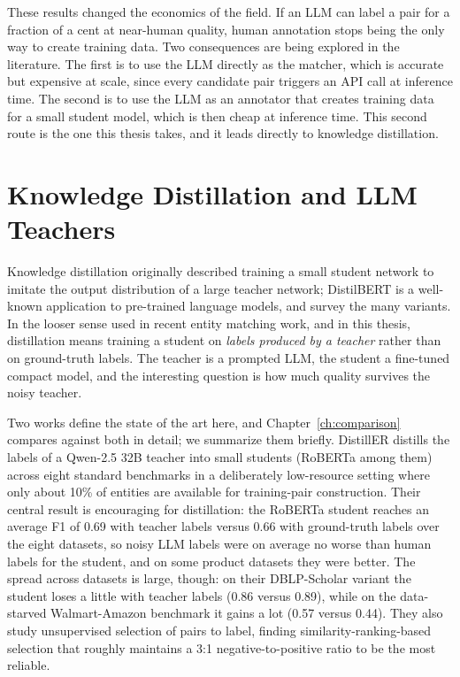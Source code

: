 \documentclass[a4paper,oneside,bibliography=totoc]{scrbook}
\begin{document}
These results changed the economics of the field. If an LLM can label a pair for a fraction of a cent at near-human quality, human annotation stops being the only way to create training data. Two consequences are being explored in the literature. The first is to use the LLM directly as the matcher, which is accurate but expensive at scale, since every candidate pair triggers an API call at inference time. The second is to use the LLM as an annotator that creates training data for a small student model, which is then cheap at inference time. This second route is the one this thesis takes, and it leads directly to knowledge distillation.

\section{Knowledge Distillation and LLM Teachers}
\label{sec:rw_distillation}

Knowledge distillation \cite{hinton2015distilling} originally described training a small student network to imitate the output distribution of a large teacher network; DistilBERT \cite{sanh2019distilbert} is a well-known application to pre-trained language models, and \citet{gou2021knowledge} survey the many variants. In the looser sense used in recent entity matching work, and in this thesis, distillation means training a student on \emph{labels produced by a teacher} rather than on ground-truth labels. The teacher is a prompted LLM, the student a fine-tuned compact model, and the interesting question is how much quality survives the noisy teacher.

Two works define the state of the art here, and Chapter~\ref{ch:comparison} compares against both in detail; we summarize them briefly. DistillER \cite{zeakis2026distiller} distills the labels of a Qwen-2.5 32B teacher into small students (RoBERTa among them) across eight standard benchmarks in a deliberately low-resource setting where only about 10\% of entities are available for training-pair construction. Their central result is encouraging for distillation: the RoBERTa student reaches an average F1 of 0.69 with teacher labels versus 0.66 with ground-truth labels over the eight datasets, so noisy LLM labels were on average no worse than human labels for the student, and on some product datasets they were better. The spread across datasets is large, though: on their DBLP-Scholar variant the student loses a little with teacher labels (0.86 versus 0.89), while on the data-starved Walmart-Amazon benchmark it gains a lot (0.57 versus 0.44). They also study unsupervised selection of pairs to label, finding similarity-ranking-based selection that roughly maintains a 3:1 negative-to-positive ratio to be the most reliable.
\end{document}
